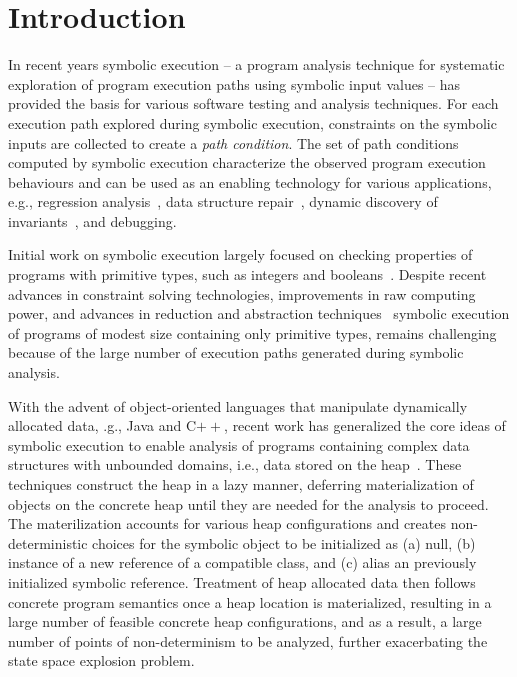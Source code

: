 \section{Introduction}

In recent years symbolic execution -- a program analysis technique for
systematic exploration of program execution paths using symbolic input
values -- has provided the basis for various software testing and
analysis techniques.  For each execution path explored during symbolic
execution, constraints on the symbolic inputs are collected to create
a \emph{path condition}. The set of path conditions computed by
symbolic execution characterize the observed program execution
behaviours and can be used as an enabling technology for various
applications, e.g., regression
analysis~\cite{backes:2012,Godefroid:SAS11,Person:FSE08,person:pldi2011,Ramos:2011,Yang:ISSTA12},
data structure repair~\cite{KhurshidETAL05RepairingStructurally},
dynamic discovery of
invariants~\cite{CsallnerETAL08DySy,Zhang:ISSTA14}, and
debugging\cite{Ma:2011}.

Initial work on symbolic execution largely focused on checking 
properties of programs with primitive types, such as integers and 
booleans~\cite{clarke76TSE,King:76}. Despite recent advances
in constraint solving technologies, improvements in
raw computing power, and advances in reduction
and abstraction techniques~\cite{AnandETAL2009AbsSymExe,Godefroid:POPL07}
symbolic execution of programs of modest size containing only
primitive types, remains challenging
because of the large number of execution paths generated
during symbolic analysis. 

With the advent of object-oriented languages that manipulate
dynamically allocated data, .g., Java and C$++$, recent work has
generalized the core ideas of symbolic execution to enable analysis of
programs containing complex data structures with unbounded domains,
i.e., data stored on the heap~\cite{Kiasan06,Kiasan07,GSE03}.  These
techniques construct the heap in a lazy manner, deferring
materialization of objects on the concrete heap until they are needed
for the analysis to proceed. The materilization accounts for various
heap configurations and creates non-deterministic choices for the
symbolic object to be initialized as (a) null, (b) instance of a new
reference of a compatible class, and (c) alias an previously
initialized symbolic reference. Treatment of heap allocated data then
follows concrete program semantics once a heap location is
materialized, resulting in a large number of feasible concrete heap
configurations, and as a result, a large number of points of
non-determinism to be analyzed, further exacerbating the state space
explosion problem.

